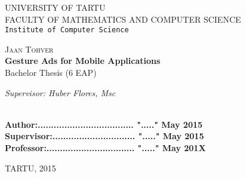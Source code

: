 \begin{titlepage}

\begin{center}



\textsc{UNIVERSITY OF TARTU}\\

\textsc{FACULTY OF MATHEMATICS AND COMPUTER SCIENCE}\\

\texttt{Institute of Computer Science}\\

\vspace{6 cm}


\textsc{ \large Jaan Tohver}\\[0.5cm]
{ \Huge \bfseries Gesture Ads for Mobile Applications}\\[0.5cm]
{\large Bachelor Thesis (6 EAP)}\\[3cm]



\begin{minipage}{0.8\textwidth}
\begin{flushright} \large
\emph{Supervisor: Huber Flores, Msc}  \\	  %
\end{flushright}
\end{minipage}

\textbf{}\\[1.0cm]

\textbf{Author:.................................... "....." May   2015}\\[0.5cm]

\textbf{Supervisor:............................... "....." May   2015}\\[0.5cm]

\textbf{Professor:................................. "....." May   201X}\\[0.5cm]        

\vfill

{\large TARTU, 2015}

\end{center}

\end{titlepage}
